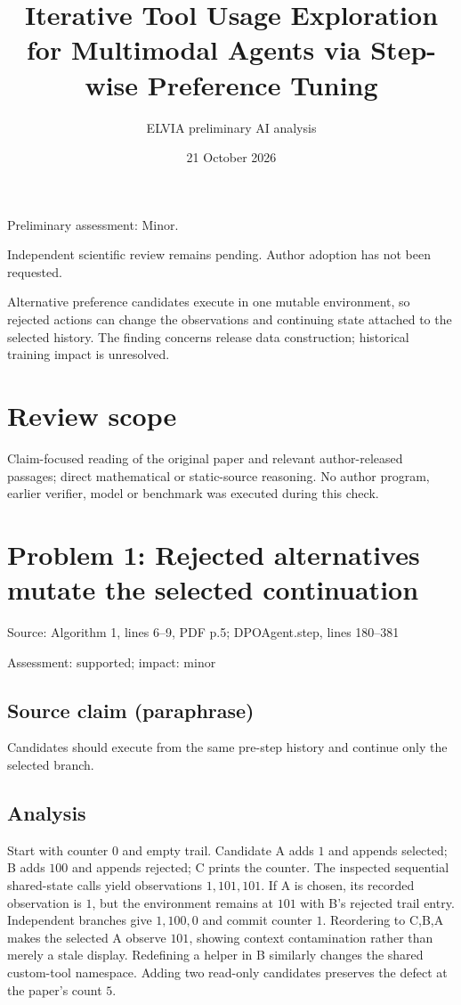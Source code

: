 \documentclass[11pt]{article}
\begin{document}
\title{Iterative Tool Usage Exploration for Multimodal Agents via Step-wise Preference Tuning}

\author{ELVIA preliminary AI analysis}\date{21 October 2026}\maketitle

Preliminary assessment: Minor.\par

Independent scientific review remains pending. Author adoption has not been requested.

Alternative preference candidates execute in one mutable environment, so rejected actions can change the observations and continuing state attached to the selected history. The finding concerns release data construction; historical training impact is unresolved.

\section*{Review scope}

Claim-focused reading of the original paper and relevant author-released passages; direct mathematical or static-source reasoning. No author program, earlier verifier, model or benchmark was executed during this check.

\section*{Problem 1: Rejected alternatives mutate the selected continuation}

Source: Algorithm 1, lines 6–9, PDF p.5; DPOAgent.step, lines 180–381

Assessment: supported; impact: minor

\subsection*{Source claim (paraphrase)}

Candidates should execute from the same pre-step history and continue only the selected branch.

\subsection*{Analysis}

Start with counter \(0\) and empty trail. Candidate A adds \(1\) and appends selected; B adds \(100\) and appends rejected; C prints the counter. The inspected sequential shared-state calls yield observations \(1,101,101\). If A is chosen, its recorded observation is \(1\), but the environment remains at \(101\) with B’s rejected trail entry. Independent branches give \(1,100,0\) and commit counter \(1\). Reordering to C,B,A makes the selected A observe \(101\), showing context contamination rather than merely a stale display. Redefining a helper in B similarly changes the shared custom-tool namespace. Adding two read-only candidates preserves the defect at the paper’s count \(5\).
\end{document}
